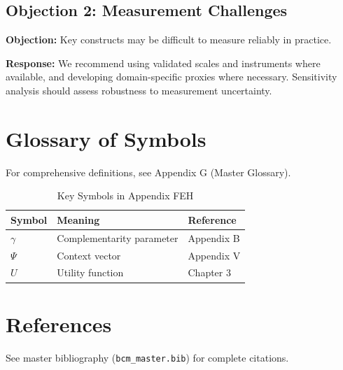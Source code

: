 \subsection{Objection 2: Measurement Challenges}

\textbf{Objection:} Key constructs may be difficult to measure reliably in
practice.

\textbf{Response:} We recommend using validated scales and instruments where
available, and developing domain-specific proxies where necessary. Sensitivity
analysis should assess robustness to measurement uncertainty.



\section{Glossary of Symbols}
\label{sec:feh-glossary}

For comprehensive definitions, see Appendix G (Master Glossary).

\begin{table}[htbp]
\centering
\caption{Key Symbols in Appendix FEH}
\begin{tabular}{lll}
\toprule
\textbf{Symbol} & \textbf{Meaning} & \textbf{Reference} \\
\midrule
$\gamma$ & Complementarity parameter & Appendix B \\
$\Psi$ & Context vector & Appendix V \\
$U$ & Utility function & Chapter 3 \\
\bottomrule
\end{tabular}
\end{table}


\section{References}
\label{sec:feh-references}

See master bibliography (\texttt{bcm\_master.bib}) for complete citations.

\nocite{bcm_master}

